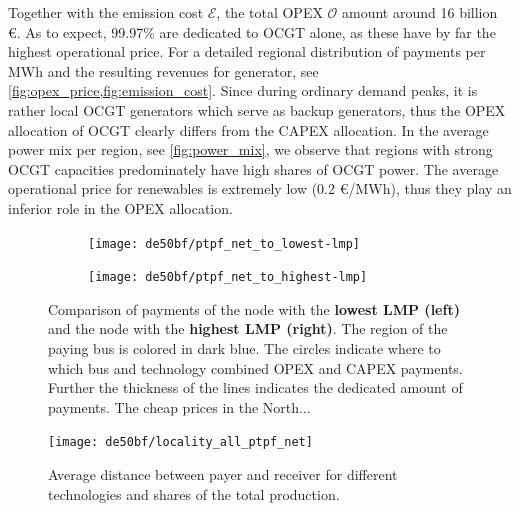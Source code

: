 \documentclass[11pt,twocolumn]{article}
\newcommand{\opex}{\mathcal{O}}
\newcommand{\emissioncost}{\mathcal{E}}
\begin{document}
Together with the emission cost $\emissioncost$, the total OPEX $\opex$ amount around 16 billion \euro. As to expect, 99.97\% are dedicated to OCGT alone, as these have by far the highest operational price. For a detailed regional distribution of payments per MWh and the resulting revenues for generator, see \cref{fig:opex_price,fig:emission_cost}. Since during ordinary demand peaks, it is rather local OCGT generators which serve as backup generators, thus the OPEX allocation of OCGT clearly differs from the CAPEX allocation. In the average power mix per region, see \cref{fig:power_mix}, we observe that regions with strong OCGT capacities predominately have high shares of OCGT power. The average operational price for renewables is extremely low (0.2 \euro/MWh), thus they play an inferior role in the OPEX allocation. \\

\begin{figure}
    \centering
    \begin{subfigure}[c]{.6\linewidth}
    \texttt{[image: de50bf/ptpf\_net\_to\_lowest-lmp]}
    \end{subfigure}
    \hspace{-.2151\linewidth}
    \begin{subfigure}[c]{.6\linewidth}
    \texttt{[image: de50bf/ptpf\_net\_to\_highest-lmp]}
    \end{subfigure}
    \caption{Comparison of payments of the node with the \textbf{lowest LMP (left)} and the node with the \textbf{highest LMP (right)}. The region of the paying bus is colored in dark blue. The circles indicate where to which bus and technology combined OPEX and CAPEX payments. Further the thickness of the lines indicates the dedicated amount of payments. The cheap prices in the North...  }
    \label{fig:direct-allocation}
\end{figure}


\begin{figure}
    \centering
    \texttt{[image: de50bf/locality\_all\_ptpf\_net]}
    \caption{Average distance between payer and receiver for different technologies and shares of the total production.}
    \label{fig:locality}
\end{figure}
\end{document}
